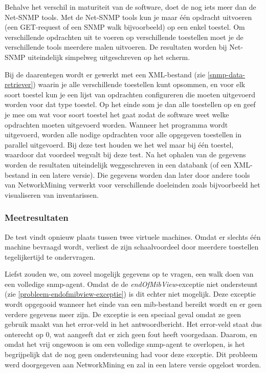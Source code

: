 Behalve het verschil in maturiteit van de software, doet de \nwmretriever{} nog iets meer dan de Net-SNMP tools.
Met de Net-SNMP tools kun je maar één opdracht uitvoeren (een GET-request of een SNMP walk bijvoorbeeld) op een enkel toestel.
Om verschillende opdrachten uit te voeren op verschillende toestellen moet je de verschillende tools meerdere malen uitvoeren.
De resultaten worden bij Net-SNMP uiteindelijk simpelweg uitgeschreven op het scherm.

Bij de \nwmretriever{} daarentegen wordt er gewerkt met een XML-bestand (zie \cref{snmp-data-retriever}) waarin je alle verschillende toestellen kunt opsommen,
en voor elk soort toestel kun je een lijst van opdrachten configureren die moeten uitgevoerd worden voor dat type toestel.
Op het einde som je dan alle toestellen op en geef je mee om wat voor soort toestel het gaat zodat de software weet welke opdrachten moeten uitgevoerd worden.
Wanneer het programma wordt uitgevoerd, worden alle nodige opdrachten voor alle opgegeven toestellen in parallel uitgevoerd.
Bij deze test houden we het wel maar bij één toestel, waardoor dat voordeel wegvalt bij deze test.
Na het ophalen van de gegevens worden de resultaten uiteindelijk weggeschreven in een databank (of een XML-bestand in een latere versie).
Die gegevens worden dan later door andere tools van NetworkMining verwerkt voor verschillende doeleinden zoals bijvoorbeeld het visualiseren van inventarissen.

\subsubsection{Meetresultaten}

De test vindt opnieuw plaats tussen twee virtuele machines.
Omdat er slechts één machine bevraagd wordt, verliest de \nwmretriever{} zijn schaalvoordeel door meerdere toestellen tegelijkertijd te ondervragen.

Liefst zouden we, om zoveel mogelijk gegevens op te vragen, een walk doen van een volledige \gls{snmp-agent}.
Omdat de \nwmretriever{} de \textit{endOfMibView}-exceptie niet ondersteunt (zie \cref{probleem-endofmibview-exceptie}) is dit echter niet mogelijk.
Deze exceptie wordt opgegooid wanneer het einde van een \gls{mib}-bestand bereikt wordt en er geen verdere gegevens meer zijn.
De exceptie is een speciaal geval omdat ze geen gebruik maakt van het error-veld in het antwoordbericht.
Het error-veld staat dus onterecht op 0, wat aangeeft dat er zich geen fout heeft voorgedaan.
Daarom, en omdat het vrij ongewoon is om een volledige \gls{snmp-agent} te overlopen,
is het begrijpelijk dat de \nwmretriever{} nog geen ondersteuning had voor deze exceptie.
Dit probleem werd doorgegeven aan NetworkMining en zal in een latere versie opgelost worden.

